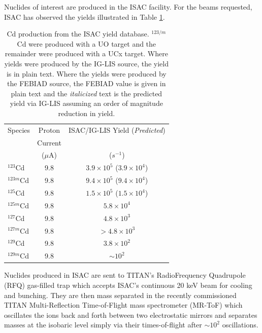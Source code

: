 \documentclass[12pt]{article}
\begin{document}
Nuclides of interest are produced in the ISAC facility. For the beams requested, ISAC has observed the yields illustrated in Table \ref{table:yields}.

\begin{table}[ht]
\centering
\begin{tabular}{|l|c|c|}
\hline
Species & Proton & ISAC/IG-LIS Yield (\emph{Predicted}) \\
& Current & \\
& ($\mu$A) & ($s^{-1}$) \\
\hline
$^{123}$Cd & 9.8 & $3.9 \times 10^5$ ($\mathit{3.9 \times 10^4}$) \\
$^{123m}$Cd & 9.8 & $9.4 \times 10^5$ ($\mathit{9.4 \times 10^4}$) \\
\hline
$^{125}$Cd & 9.8 & $1.5 \times 10^5$ ($\mathit{1.5 \times 10^4}$) \\
$^{125m}$Cd & 9.8 & $5.8 \times 10^4$ \\
\hline
$^{127}$Cd & 9.8 & $4.8 \times 10^3$ \\
$^{127m}$Cd & 9.8 & $>4.8 \times 10^3$ \\
\hline
$^{129}$Cd & 9.8 & $3.8 \times 10^2$ \\
$^{129m}$Cd & 9.8 & $\sim 10^2$ \\
\hline
\end{tabular}
\caption{Cd production from the ISAC yield database. $^{123/m}$Cd were produced with a UO target and the remainder were produced with a UCx target. Where yields were produced by the IG-LIS source, the yield is in plain text. Where the yields were produced by the FEBIAD source, the FEBIAD value is given in plain text and the \emph{italicized} text is the predicted yield via IG-LIS assuming an order of magnitude reduction in yield.}
\label{table:yields}
\end{table}

Nuclides produced in ISAC are sent to TITAN's RadioFrequency Quadrupole (RFQ) gas-filled trap which accepts ISAC's continuous 20 keV beam for cooling and bunching. They are then mass separated in the recently commissioned TITAN Multi-Reflection Time-of-Flight mass spectrometer (MR-ToF) \cite{Jesch2015} which oscillates the ions back and forth between two electrostatic mirrors and separates masses at the isobaric level simply via their times-of-flight after $\sim 10^2$ oscillations.
\end{document}

